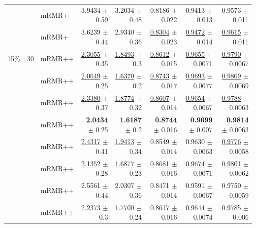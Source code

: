 \begin{longtable}{llp{}rrrrr}
 &  & mRMR+ & 3.9434 {\scriptsize $\pm$ 0.59} & 3.2034 {\scriptsize $\pm$ 0.48} & 0.8186 {\scriptsize $\pm$ 0.022} & 0.9413 {\scriptsize $\pm$ 0.013} & 0.9573 {\scriptsize $\pm$ 0.011} \\
 &  & mRMR+ & 3.6239 {\scriptsize $\pm$ 0.44} & 2.9340 {\scriptsize $\pm$ 0.36} & \underline{0.8304} {\scriptsize $\pm$ 0.023} & \underline{0.9472} {\scriptsize $\pm$ 0.014} & \underline{0.9615} {\scriptsize $\pm$ 0.011} \\
\midrule
15\% & 30 & mRMR++ & \underline{2.3055} {\scriptsize $\pm$ 0.35} & \underline{1.8493} {\scriptsize $\pm$ 0.3} & \underline{0.8612} {\scriptsize $\pm$ 0.015} & \underline{0.9655} {\scriptsize $\pm$ 0.0071} & \underline{0.9790} {\scriptsize $\pm$ 0.0067} \\
 &  & mRMR++ & \underline{2.0649} {\scriptsize $\pm$ 0.25} & \underline{1.6370} {\scriptsize $\pm$ 0.2} & \underline{0.8743} {\scriptsize $\pm$ 0.017} & \underline{0.9693} {\scriptsize $\pm$ 0.0077} & \underline{0.9809} {\scriptsize $\pm$ 0.0069} \\
 &  & mRMR++ & \underline{2.3380} {\scriptsize $\pm$ 0.37} & \underline{1.8774} {\scriptsize $\pm$ 0.32} & \underline{0.8607} {\scriptsize $\pm$ 0.014} & \underline{0.9654} {\scriptsize $\pm$ 0.0067} & \underline{0.9788} {\scriptsize $\pm$ 0.0063} \\
 &  & mRMR++ & \textbf{2.0434} {\scriptsize $\pm$ 0.25} & \textbf{1.6187} {\scriptsize $\pm$ 0.2} & \textbf{0.8744} {\scriptsize $\pm$ 0.016} & \textbf{0.9699} {\scriptsize $\pm$ 0.007} & \textbf{0.9814} {\scriptsize $\pm$ 0.0063} \\
 &  & mRMR++ & \underline{2.4317} {\scriptsize $\pm$ 0.41} & \underline{1.9413} {\scriptsize $\pm$ 0.34} & 0.8549 {\scriptsize $\pm$ 0.014} & 0.9630 {\scriptsize $\pm$ 0.0063} & \underline{0.9776} {\scriptsize $\pm$ 0.0058} \\
 &  & mRMR++ & \underline{2.1352} {\scriptsize $\pm$ 0.28} & \underline{1.6877} {\scriptsize $\pm$ 0.23} & \underline{0.8681} {\scriptsize $\pm$ 0.016} & \underline{0.9674} {\scriptsize $\pm$ 0.0071} & \underline{0.9801} {\scriptsize $\pm$ 0.0062} \\
 &  & mRMR++ & 2.5561 {\scriptsize $\pm$ 0.44} & 2.0307 {\scriptsize $\pm$ 0.36} & 0.8471 {\scriptsize $\pm$ 0.014} & 0.9591 {\scriptsize $\pm$ 0.0067} & 0.9750 {\scriptsize $\pm$ 0.0059} \\
 &  & mRMR++ & \underline{2.2373} {\scriptsize $\pm$ 0.3} & \underline{1.7700} {\scriptsize $\pm$ 0.24} & \underline{0.8617} {\scriptsize $\pm$ 0.016} & \underline{0.9644} {\scriptsize $\pm$ 0.0074} & \underline{0.9785} {\scriptsize $\pm$ 0.006} \\

\end{longtable}
